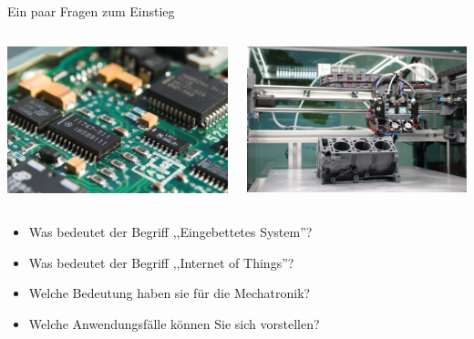 \begin{frame}{Ein paar Fragen zum Einstieg}
    \begin{columns}
        \begin{column}[b]{.5\textwidth}
            \begin{center}
                \includegraphics[width=\textwidth]{img/iot-hardware}
            \end{center}
        \end{column}
        \begin{column}[b]{.5\textwidth}
            \begin{center}
                \includegraphics[width=\textwidth]{img/iot-mechatronik}
            \end{center}
        \end{column}
    \end{columns}

    \bigskip

    \begin{itemize}
        \item Was bedeutet der Begriff ,,Eingebettetes System''?
        \item Was bedeutet der Begriff ,,Internet of Things''?
        \item Welche Bedeutung haben sie für die Mechatronik?
        \item Welche Anwendungsfälle können Sie sich vorstellen?
    \end{itemize}
\end{frame}

